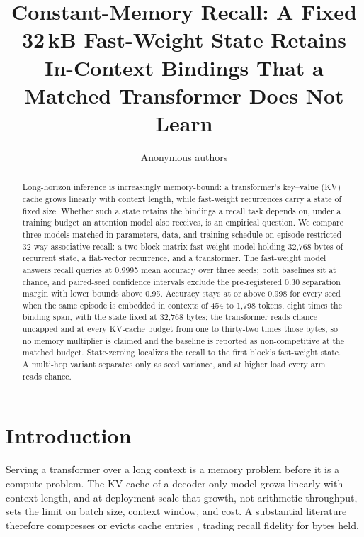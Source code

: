 \documentclass{article}
\title{Constant-Memory Recall: A Fixed 32\,kB Fast-Weight State Retains
In-Context Bindings That a Matched Transformer Does Not Learn}
\author{Anonymous authors}
\begin{document}
\maketitle

\begin{abstract}
Long-horizon inference is increasingly memory-bound: a transformer's
key--value (KV) cache grows linearly with
context length, while fast-weight recurrences carry a state of fixed size.
Whether such a state retains the bindings a recall task depends on, under a
training budget an attention model also receives, is an empirical question.
We compare three models matched in parameters, data, and training schedule
on episode-restricted 32-way associative recall: a two-block matrix
fast-weight model holding 32{,}768 bytes of recurrent
state, %
a flat-vector recurrence, and a transformer. The fast-weight model answers recall queries
at 0.9995 mean accuracy over three seeds; %
both baselines sit at chance, and paired-seed confidence intervals exclude
the pre-registered 0.30 separation margin with lower bounds above
0.95. %
Accuracy stays at or above 0.998 for every seed when the same episode is
embedded in contexts of 454 to 1{,}798 tokens, eight times the binding
span, with the state fixed at 32{,}768 bytes; %
the transformer reads chance uncapped and at every KV-cache budget from one
to thirty-two times those bytes, %
so no memory multiplier is claimed and the baseline is reported as
non-competitive at the matched budget. State-zeroing localizes the recall
to the first block's fast-weight state. %
A multi-hop variant separates only as seed variance, and at higher load
every arm reads chance. %
\end{abstract}

\section{Introduction}

Serving a transformer over a long context is a memory problem before it is a
compute problem. The KV cache of a decoder-only model
\citep{vaswani2017attention} grows linearly with context length, and at
deployment scale that growth, not arithmetic throughput, sets the limit on
batch size, context window, and cost. A substantial literature therefore
compresses or evicts cache entries \citep{xiao2023efficient, zhang2023h2o},
trading recall fidelity for bytes held.
\end{document}
